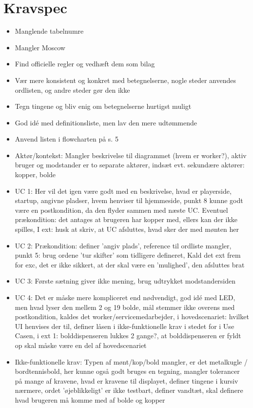 \documentclass[a4paper,12pt,fleqn,oneside]{article}
\begin{document}
\section{Kravspec}
\begin{itemize}
    \item Manglende tabelnumre
    \item Mangler Moscow
    \item Find officielle regler og vedhæft dem som bilag
    \item Vær mere konsistent og konkret med betegnelserne, nogle steder anvendes ordlisten, og andre steder gør den ikke
    \item Tegn tingene og bliv enig om betegnelserne hurtigst muligt
    \item God idé med definitionsliste, men lav den mere udtømmende
    \item Anvend listen i flowcharten på s. 5
    \item Aktør/kontekst: Mangler beskrivelse til diagrammet (hvem er worker?), aktiv bruger og modstander er to separate aktører, indsæt evt. sekundære aktører: kopper, bolde
    \item UC 1: Her vil det igen være godt med en beskrivelse, hvad er playerside, startup, angivne pladser, hvem henviser til hjemmeside, punkt 8 kunne godt være en postkondition, da den flyder sammen med næste UC. Eventuel prækondition: det antages at brugeren har kopper med, ellers kan der ikke spilles, I ext: husk at skriv, at UC afsluttes, hvad sker der med mønten her
    \item UC 2: Prækondition: definer 'angiv plads', reference til ordliste mangler, punkt 5: brug ordene 'tur skifter' som tidligere defineret, Kald det ext frem for exc, det er ikke sikkert, at der skal være en 'mulighed', den afsluttes brat
    \item UC 3: Første sætning giver ikke mening, brug udtrykket modstandersiden
    \item UC 4: Det er måske mere kompliceret end nødvendigt, god idé med LED, men hvad lyser den mellem 2 og 19 bolde, mål stemmer ikke overens med postkondition, kaldes det worker/servicemedarbejder, i hovedscenariet: hvilket UI henvises der til, definer låsen i ikke-funktionelle krav i stedet for i Use Casen, i ext 1: bolddispenseren lukkes 2 gange?, at bolddispenseren er fyldt op skal måske være en del af hovedscenariet
    \item Ikke-funktionelle krav: Typen af mønt/kop/bold mangler, er det metalkugle / bordtennisbold, her kunne også godt bruges en tegning, mangler tolerancer på mange af kravene, hvad er kravene til displayet, definer tingene i kursiv nærmere, ordet 'øjeblikkeligt' er ikke testbart, definer vandtæt, skal definere hvad brugeren må komme med af bolde og kopper
\end{itemize}
\end{document}
